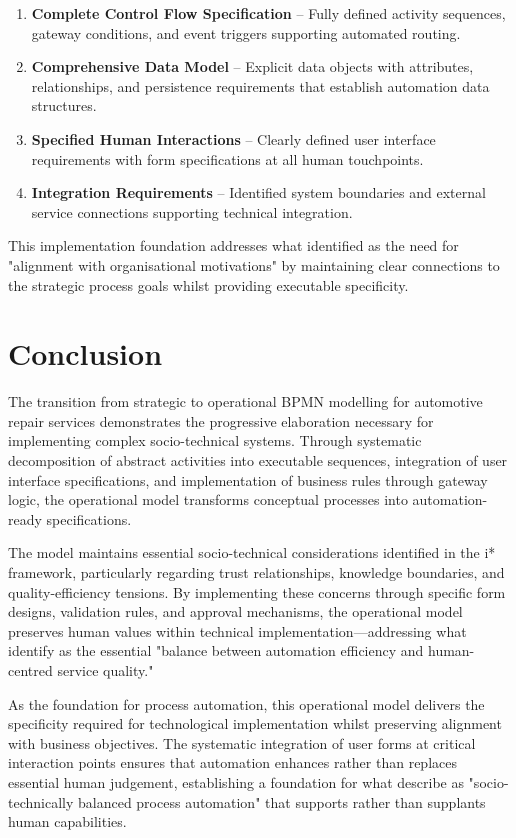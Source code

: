 \documentclass[14pt,a4paper]{article}
\begin{document}
\begin{enumerate}
    \item \textbf{Complete Control Flow Specification} – Fully defined activity sequences, gateway conditions, and event triggers supporting automated routing.

    \item \textbf{Comprehensive Data Model} – Explicit data objects with attributes, relationships, and persistence requirements that establish automation data structures.

    \item \textbf{Specified Human Interactions} – Clearly defined user interface requirements with form specifications at all human touchpoints.

    \item \textbf{Integration Requirements} – Identified system boundaries and external service connections supporting technical integration.
\end{enumerate}

This implementation foundation addresses what \textit{\parencite[p. 47]{Lezcano2022}} identified as the need for "alignment with organisational motivations" by maintaining clear connections to the strategic process goals whilst providing executable specificity.

\section{Conclusion}

The transition from strategic to operational BPMN modelling for automotive repair services demonstrates the progressive elaboration necessary for implementing complex socio-technical systems. Through systematic decomposition of abstract activities into executable sequences, integration of user interface specifications, and implementation of business rules through gateway logic, the operational model transforms conceptual processes into automation-ready specifications.

The model maintains essential socio-technical considerations identified in the i* framework, particularly regarding trust relationships, knowledge boundaries, and quality-efficiency tensions. By implementing these concerns through specific form designs, validation rules, and approval mechanisms, the operational model preserves human values within technical implementation—addressing what \textit{\parencite[p. 217]{Dumas2018}} identify as the essential "balance between automation efficiency and human-centred service quality."

As the foundation for process automation, this operational model delivers the specificity required for technological implementation whilst preserving alignment with business objectives. The systematic integration of user forms at critical interaction points ensures that automation enhances rather than replaces essential human judgement, establishing a foundation for what \textit{\parencite[p. 197]{Calegari2020}} describe as "socio-technically balanced process automation" that supports rather than supplants human capabilities.

\newpage

\printbibliography
\end{document}
